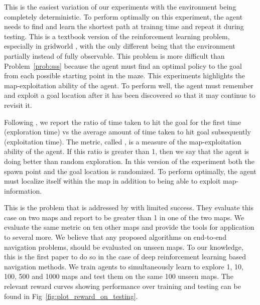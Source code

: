 \begin{description}
  \label{prob:sss}
   This is the easiest variation of our experiments with the environment
   being completely deterministic. 
   To perform optimally on this experiment, the agent needs to find and learn the
   shortest path at trainng time and repeat it during testing. 
  This is a textbook version of the reinforcement learning problem, especially in gridworld \cite{SuBaBOOK1998}, with the only different being that the environment partially instead of fully observable.
  This problem is more difficult than Problem~\ref{prob:sss} because the agent
  must find an optimal policy to the goal from each possible starting point in the maze.
  This experiments highlights the map-exploitation ability of the agent. To perform well, the agent must remember and exploit a goal location after it has been discovered so that it may continue to revisit it.  
  
  Following \cite{MiPaViICLR2017}, we report the ratio
  of time taken to hit the goal for the first time (exploration time) vs the average amount of time taken to hit goal subsequently (exploitation time). The metric, called \LatencyOneGtOne{}, is a measure of the map-exploitation ability of the agent. 
  If this ratio is greater than 1, then we say that the agent is doing better than random exploration.
  In this version of the experiment both the spawn point and the goal location is randomized. To perform optimally, the agent must localize itself within the map in addition to being able to exploit map-information.
  
  This is the problem that is addressed by \cite{MiPaViICLR2017} with limited success. 
  They evaluate this case on two maps and report \LatencyOneGtOne{} to be greater than 1 in one of the two maps. We evaluate the same metric on ten other maps and provide the tools for application to several more.
    We believe that any proposed algorithms on end-to-end navigation problems, should be evaluated on unseen maps.
    To our knowledge, this is the first paper to do so in the case of deep reinforcement learning based navigation methods.
    We train agents to simultaneously learn to explore 1, 10, 100, 500 and 1000 maps and test them on the same 100 unseen maps. The relevant reward curves showing performance over training and testing can be found in Fig~\ref{fig:plot_reward_on_testing}. 
\end{description}

